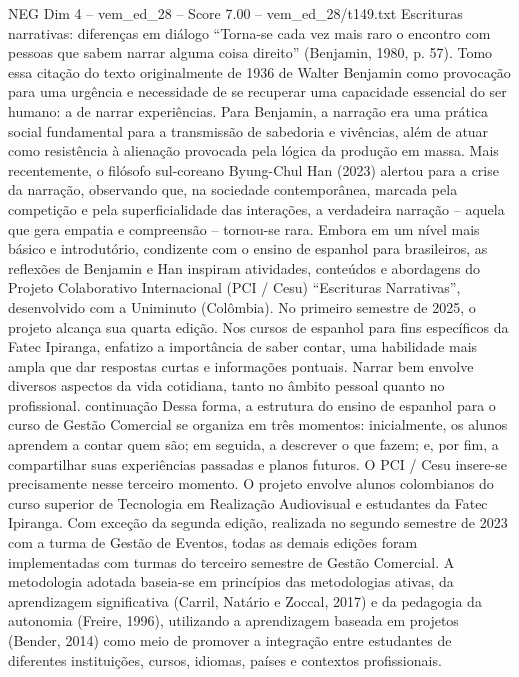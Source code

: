 \begin{textsample}{NEG Dim 4 – vem\_ed\_28 – Score 7.00 – vem\_ed\_28/t149.txt}  \label{ex:f4_neg_134}
Escrituras narrativas: diferenças em diálogo “Torna-se cada vez mais raro o encontro com pessoas que sabem narrar alguma coisa direito” (Benjamin, 1980, p. 57).
Tomo essa citação do texto originalmente de 1936 de Walter Benjamin como provocação para uma urgência e necessidade de se recuperar uma capacidade essencial do ser humano: a de narrar experiências.
Para Benjamin, a narração era uma prática social fundamental para a transmissão de sabedoria e vivências, além de atuar como resistência à alienação provocada pela lógica da produção em massa.
Mais recentemente, o filósofo sul-coreano Byung-Chul Han (2023) alertou para a crise da narração, observando que, na sociedade contemporânea, marcada pela competição e pela superficialidade das interações, a verdadeira narração – aquela que gera empatia e compreensão – tornou-se rara.
Embora em um nível mais básico e introdutório, condizente com o ensino de espanhol para brasileiros, as reflexões de Benjamin e Han inspiram atividades, conteúdos e abordagens do Projeto Colaborativo Internacional (PCI / Cesu) “Escrituras Narrativas”, desenvolvido com a Uniminuto (Colômbia).
No primeiro semestre de 2025, o projeto alcança sua quarta edição.
Nos cursos de espanhol para fins específicos da Fatec Ipiranga, enfatizo a importância de saber contar, uma habilidade mais ampla que dar respostas curtas e informações pontuais.
Narrar bem envolve diversos aspectos da vida cotidiana, tanto no âmbito pessoal quanto no profissional. continuação Dessa forma, a estrutura do ensino de espanhol para o curso de Gestão Comercial se organiza em três momentos: inicialmente, os alunos aprendem a contar quem são; em seguida, a descrever o que fazem; e, por fim, a compartilhar suas experiências passadas e planos futuros.
O PCI / Cesu insere-se precisamente nesse terceiro momento.
O projeto envolve alunos colombianos do curso superior de Tecnologia em Realização Audiovisual e estudantes da Fatec Ipiranga.
Com exceção da segunda edição, realizada no segundo semestre de 2023 com a turma de Gestão de Eventos, todas as demais edições foram implementadas com turmas do terceiro semestre de Gestão Comercial.
A metodologia adotada baseia-se em princípios das metodologias ativas, da aprendizagem significativa (Carril, Natário e Zoccal, 2017) e da pedagogia da autonomia (Freire, 1996), utilizando a aprendizagem baseada em projetos (Bender, 2014) como meio de promover a integração entre estudantes de diferentes instituições, cursos, idiomas, países e contextos profissionais.

\end{textsample}

